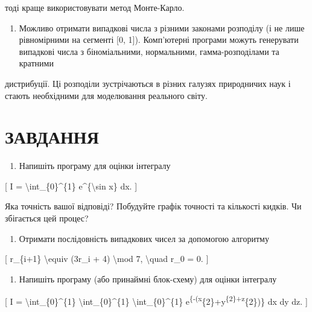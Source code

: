\documentclass[
]{article}
\providecommand{\tightlist}{%
  \setlength{\itemsep}{0pt}\setlength{\parskip}{0pt}}
\begin{document}
тоді краще використовувати метод Монте-Карло.

\begin{enumerate}
\def\labelenumi{\arabic{enumi}.}
\setcounter{enumi}{2}
\tightlist
\item
  Можливо отримати випадкові числа з різними законами розподілу (і не
  лише рівномірними на сегменті {[}0, 1{]}). Комп'ютерні програми можуть
  генерувати випадкові числа з біноміальними, нормальними,
  гамма-розподілами та кратними
\end{enumerate}

дистрибуції. Ці розподіли зустрічаються в різних галузях природничих
наук і стають необхідними для моделювання реального світу.

\section{ЗАВДАННЯ}\label{ux437ux430ux432ux434ux430ux43dux43dux44f-10}

\begin{enumerate}
\def\labelenumi{\arabic{enumi}.}
\tightlist
\item
  Напишіть програму для оцінки інтегралу
\end{enumerate}

{[} I = \textbackslash int\_\{0\}\^{}\{1\} e\^{}\{\textbackslash sin x\}
dx. {]}

Яка точність вашої відповіді? Побудуйте графік точності та кількості
кидків. Чи збігається цей процес?

\begin{enumerate}
\def\labelenumi{\arabic{enumi}.}
\setcounter{enumi}{1}
\tightlist
\item
  Отримати послідовність випадкових чисел за допомогою алгоритму
\end{enumerate}

{[} r\_\{i+1\} \textbackslash equiv (3r\_i + 4) \textbackslash mod 7,
\textbackslash quad r\_0 = 0. {]}

\begin{enumerate}
\def\labelenumi{\arabic{enumi}.}
\setcounter{enumi}{2}
\tightlist
\item
  Напишіть програму (або принаймні блок-схему) для оцінки інтегралу
\end{enumerate}

{[} I = \textbackslash int\_\{0\}\^{}\{1\}
\textbackslash int\_\{0\}\^{}\{1\} \textbackslash int\_\{0\}\^{}\{1\}
e\textsuperscript{\{-(x}\{2\}+y\textsuperscript{\{2\}+z}\{2\})\} dx dy
dz. {]}
\end{document}
